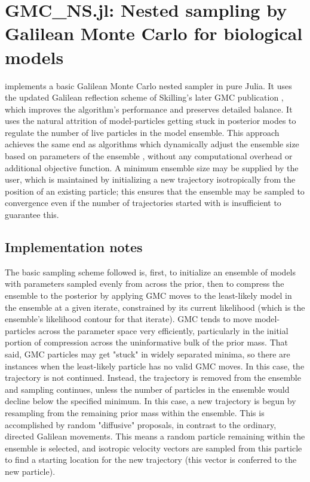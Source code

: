 \chapter{GMC\_NS.jl: Nested sampling by Galilean Monte Carlo for biological models}
\label{chap:GMC}
 implements a basic Galilean Monte Carlo nested sampler \cite{Skilling2012,Skilling2019} in pure Julia. It uses the updated Galilean reflection scheme of Skilling's later GMC publication \cite{Skilling2019}, which improves the algorithm's performance and preserves detailed balance. It uses the natural attrition of model-particles getting stuck in posterior modes to regulate the number of live particles in the model ensemble. This approach achieves the same end as algorithms which dynamically adjust the ensemble size based on parameters of the ensemble \cite{Feroz2009,Higson2019}, without any computational overhead or additional objective function. A minimum ensemble size may be supplied by the user, which is maintained by initializing a new trajectory isotropically from the position of an existing particle; this ensures that the ensemble may be sampled to convergence even if the number of trajectories started with is insufficient to guarantee this. 

\section{Implementation notes}

The basic sampling scheme followed is, first, to initialize an ensemble of models with parameters sampled evenly from across the prior, then to compress the ensemble to the posterior by applying GMC moves to the least-likely model in the ensemble at a given iterate, constrained by its current likelihood (which is the ensemble's likelihood contour for that iterate). GMC tends to move model-particles across the parameter space very efficiently, particularly in the initial portion of compression across the uninformative bulk of the prior mass. That said, GMC particles may get "stuck" in widely separated minima, so there are instances when the least-likely particle has no valid GMC moves. In this case, the trajectory is not continued. Instead, the trajectory is removed from the ensemble and sampling continues, unless the number of particles in the ensemble would decline below the specified minimum. In this case, a new trajectory is begun by resampling from the remaining prior mass within the ensemble. This is accomplished by random "diffusive" proposals, in contrast to the ordinary, directed Galilean movements. This means a random particle remaining within the ensemble is selected, and isotropic velocity vectors are sampled from this particle to find a starting location for the new trajectory (this vector is conferred to the new particle).

